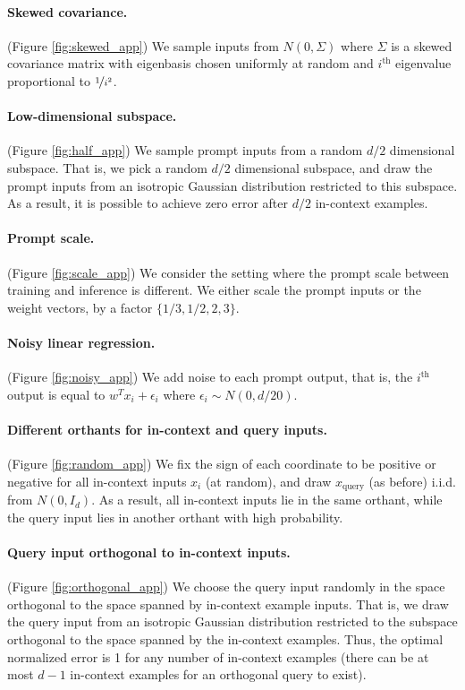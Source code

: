 \paragraph{Skewed covariance.} (Figure \ref{fig:skewed_app}) We sample inputs from $N(0, \Sigma)$ where $\Sigma$ is a skewed covariance matrix with eigenbasis chosen uniformly at random and $i^{\text{th}}$ eigenvalue proportional to $\nicefrac{1}{i^2}$.

\paragraph{Low-dimensional subspace.} (Figure \ref{fig:half_app}) We sample prompt inputs from a random $d/2$ dimensional subspace. That is, we pick a random $d/2$ dimensional subspace, and draw the prompt inputs from an isotropic Gaussian distribution restricted to this subspace.
As a result, it is possible to achieve zero error after $d/2$ in-context examples.

\paragraph{Prompt scale.} (Figure \ref{fig:scale_app}) We consider the setting where the prompt scale between training and inference is different. We either scale the prompt inputs or the weight vectors, by a factor $\{1/3, 1/2,  2, 3\}$.

\paragraph{Noisy linear regression.} (Figure \ref{fig:noisy_app}) We add noise to each prompt output, that is, the $i^{\text{th}}$ output is equal to $w^T x_i + \epsilon_i$ where $\epsilon_i \sim N(0, d/20)$. 

\paragraph{Different orthants for in-context and query inputs.}(Figure \ref{fig:random_app}) We fix the sign of each coordinate to be positive or negative for all in-context inputs $x_i$ (at random), and draw $x_\text{query}$ (as before) i.i.d. from $N(0, I_d)$. 
As a result, all in-context inputs lie in the same orthant, while the query input lies in another orthant with high probability.

\paragraph{Query input orthogonal to in-context inputs.}(Figure \ref{fig:orthogonal_app}) We choose the query input randomly in the space orthogonal to the space spanned by in-context example inputs.
That is, we  draw the query input from an isotropic Gaussian distribution restricted to the subspace orthogonal to the space spanned by the in-context examples. 
Thus, the optimal normalized error is 1 for any number of in-context examples (there can be at most $d-1$ in-context examples for an orthogonal query to exist).

